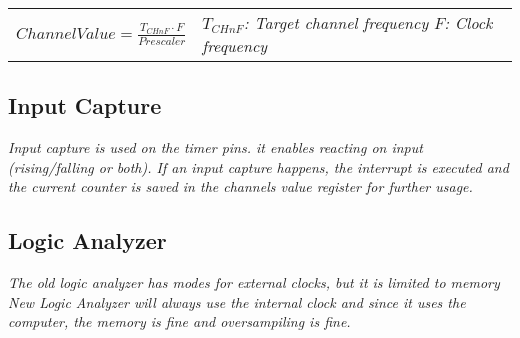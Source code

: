 \begin{tabular}{cp{}}
    $ChannelValue = \frac{T_{CHnF} \cdot F}{Prescaler}$&
    \textit{
        $T_{CHnF}$: Target channel frequency\newline
        $F$: Clock frequency
    } \\
\end{tabular}


\subsection{Input Capture}

\textit{
    Input capture is used on the timer pins. it enables
    reacting on input (rising/falling or both).\newline
    If an input capture happens, the interrupt is
    executed and the current counter is saved in the channels
    value register for further usage.
}

\subsection{Logic Analyzer}

\textit{
    The old logic analyzer has modes for external clocks, but it is limited
    to memory \newline \newline
    New Logic Analyzer will always use the internal clock and since it uses
    the computer, the memory is fine and oversampiling is fine.
}
